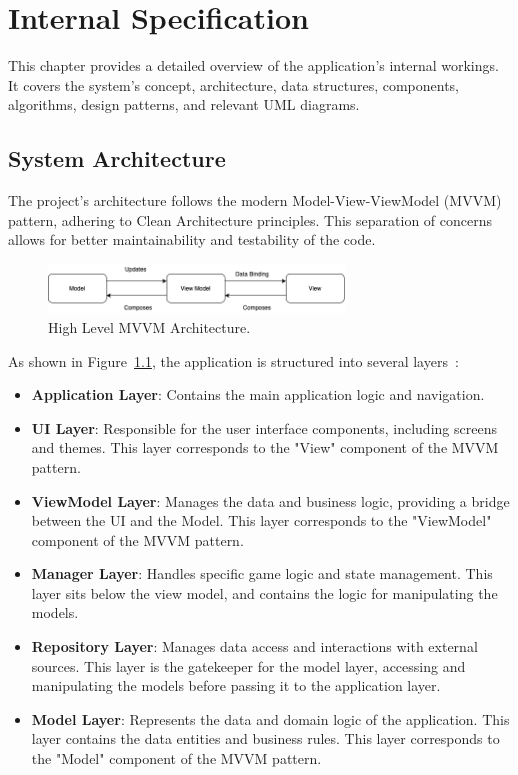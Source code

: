 \chapter{Internal Specification}
\label{chap:internal-specifications}

This chapter provides a detailed overview of the application's internal workings. It covers the system's concept, architecture, data structures, components, algorithms, design patterns, and relevant UML diagrams.

\section{System Architecture}

The project's architecture follows the modern Model-View-ViewModel (MVVM) pattern, adhering to Clean Architecture principles. This separation of concerns allows for better maintainability and testability of the code.

\begin{figure}[ht!]
    \centering
    \includegraphics[width=0.7\textwidth]{img/mvvm_explanation.png}
    \caption{High Level MVVM Architecture.}
    \label{fig:mvvm_explanation}
\end{figure}

As shown in Figure~\ref{fig:mvvm_explanation}, the application is structured into several layers~\cite{bib:mvvm}:

\begin{itemize}
    \item \textbf{Application Layer}: Contains the main application logic and navigation.
    \item \textbf{UI Layer}: Responsible for the user interface components, including screens and themes. This layer corresponds to the "View" component of the MVVM pattern.
    \item \textbf{ViewModel Layer}: Manages the data and business logic, providing a bridge between the UI and the Model. This layer corresponds to the "ViewModel" component of the MVVM pattern.
    \item \textbf{Manager Layer}: Handles specific game logic and state management. This layer sits below the view model, and contains the logic for manipulating the models.
    \item \textbf{Repository Layer}: Manages data access and interactions with external sources. This layer is the gatekeeper for the model layer, accessing and manipulating the models before passing it to the application layer.
    \item \textbf{Model Layer}: Represents the data and domain logic of the application. This layer contains the data entities and business rules. This layer corresponds to the "Model" component of the MVVM pattern.
\end{itemize}

